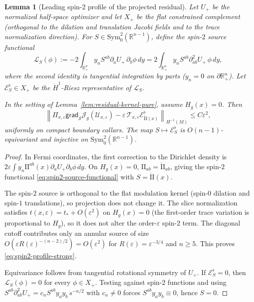\documentclass[11pt,reqno,a4paper]{amsart}
\numberwithin{equation}{section}
\theoremstyle{plain}
\newtheorem{lemma}[theorem]{Lemma}
\theoremstyle{remark}
\theoremstyle{plain}
\begin{document}
\begin{lemma}[Leading spin-$2$ profile of the projected residual]
\label{lem:spin2-profile}
Let $U_+$ be the normalized half-space optimizer and let $X_+$ be the flat
constrained complement (orthogonal to the dilation and translation Jacobi
fields and to the trace normalization direction).
For $S\in\mathrm{Sym}^2_0(\mathbb R^{n-1})$, define the spin-$2$ source
functional
\begin{equation}\label{eq:spin2-source-functional}
\mathscr L_S(\phi)
:=
-2\int_{\mathbb R^n_+}
y_n S^{ab}\partial_aU_+\,\partial_b\phi\,dy
=
2\int_{\mathbb R^n_+}
y_n S^{ab}\partial_{ab}^2U_+\,\phi\,dy,
\end{equation}
where the second identity is tangential integration by parts ($y_n=0$ on
$\partial\mathbb R^n_+$).
Let $\mathcal E_S^\flat\in X_+$ be the $\dot H^1$-Riesz representative of
$\mathscr L_S$.

In the setting of Lemma~\ref{lem:residual-kernel-pure}, assume $H_g(x)=0$.
Then
\begin{equation}\label{eq:spin2-profile-strong}
\left\|
\Pi_{x,\varepsilon}
\mathsf{grad}_{\mathcal S}\mathcal J_g(\mathcal U_{x,\varepsilon})
-
\varepsilon\,\mathcal T_{x,\varepsilon}\mathcal E^\flat_{\mathring{\mathrm{II}}(x)}
\right\|_{H^{-1}(M)}
\le
C\varepsilon^2,
\end{equation}
uniformly on compact boundary collars.  The map
$S\mapsto \mathcal E_S^\flat$ is $O(n-1)$-equivariant and injective on
$\mathrm{Sym}^2_0(\mathbb R^{n-1})$.
\end{lemma}

\begin{proof}
In Fermi coordinates, the first correction to the Dirichlet density is
$2\varepsilon\int y_n\mathrm{II}^{ab}(x)\partial_aU_+\partial_b\phi\,dy$.
On $H_g(x)=0$, $\mathrm{II}_{ab}=\mathring{\mathrm{II}}_{ab}$, giving the
spin-$2$ functional \eqref{eq:spin2-source-functional} with
$S=\mathring{\mathrm{II}}(x)$.

The spin-$2$ source is orthogonal to the flat modulation kernel (spin-$0$
dilation and spin-$1$ translations), so projection does not change it.
The slice normalization satisfies $t(x,\varepsilon)=t_\ast+O(\varepsilon^2)$
on $H_g(x)=0$ (the first-order trace variation is proportional to $H_g$),
so it does not alter the order-$\varepsilon$ spin-$2$ term.
The diagonal cutoff contributes only an annular source of size
$O(\varepsilon R(\varepsilon)^{-(n-2)/2})=O(\varepsilon^2)$ for
$R(\varepsilon)=\varepsilon^{-3/4}$ and $n\ge5$.
This proves \eqref{eq:spin2-profile-strong}.

Equivariance follows from tangential rotational symmetry of $U_+$.
If $\mathcal E_S^\flat=0$, then $\mathscr L_S(\phi)=0$ for every
$\phi\in X_+$.  Testing against spin-$2$ functions and using
$S^{ab}\partial_{ab}^2U_+=c_n S^{ab}y_ay_b\,s^{-n/2}$ with $c_n\neq0$
forces $S^{ab}y_ay_b\equiv0$, hence $S=0$.
\end{proof}
\end{document}
